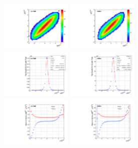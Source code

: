\begin{figure}
  \begin{center}
    \includegraphics[width=0.30\textwidth]{fig_fullRun2UL/KinRecoResolutions/ttbar_rapidity_genreco_prompt.pdf}
    \includegraphics[width=0.30\textwidth]{fig_fullRun2UL/KinRecoResolutions/ttbar_rapidity_genreco_viatau.pdf}\\
    \includegraphics[width=0.30\textwidth]{fig_fullRun2UL/KinRecoResolutions/ttbar_rapidity_residual_prompt.pdf}
    \includegraphics[width=0.30\textwidth]{fig_fullRun2UL/KinRecoResolutions/ttbar_rapidity_residual_viatau.pdf}\\
    \includegraphics[width=0.30\textwidth]{fig_fullRun2UL/KinRecoResolutions/ttbar_rapidity_multiresidual_prompt.pdf}
    \includegraphics[width=0.30\textwidth]{fig_fullRun2UL/KinRecoResolutions/ttbar_rapidity_multiresidual_viatau.pdf}\\

\end{center}
\end{figure}
